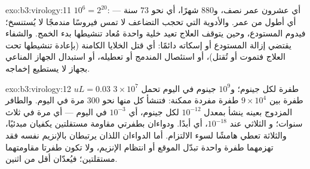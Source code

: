 \begin{solution}{exo:b3:virology:11}
$10^{6} = 2^{20}$: أي عشرون عمر نصف، و$880$ شهرًا، أي نحو $73$ سنة ---
أي أطول من عمر. والأدوية التي تحجب التضاعف لا تمس
فيروسًا مندمجًا لا يُستنسخ؛ فيدوم المستودع، وحين
يتوقف العلاج تعيد خلية واحدة مُعاد تنشيطها بدء الخمج. والشفاء
يقتضي إزالة المستودع أو إسكاته دائمًا: أي قتل الخلايا الكامنة
(بإعادة تنشيطها تحت العلاج فتموت أو تُقتل)، أو استئصال
 المندمج أو تعطيله، أو استبدال الجهاز المناعي بجهاز لا يستطيع 
إخماجه.
\end{solution}

\begin{solution}{exo:b3:virology:12}
$uL = 0.03$ طفرة لكل جينوم؛ و$10^{9}$ جينوم في اليوم تحمل $3\times
10^{7}$ طفرة بين $9\times 10^{4}$ طفرة مفردة ممكنة: فتنشأ كل
منها نحو $300$ مرة في اليوم. والطافر المزدوج بعينه ينشأ بمعدل
$10^{-12}$ لكل جينوم، أي $10^{-3}$ في اليوم --- أي مرة في ثلاث سنوات؛ و
الثلاثي عند $10^{-18}$، أي أبدًا. ودواءان بطفرتي مقاومة
مستقلتين يكفيان مبدئيًا، والثلاثة تعطي هامشًا لسوء
الالتزام. أما الدواءان اللذان يرتبطان بالإنزيم نفسه فقد تهزمهما طفرة
واحدة تبدّل الموقع أو انتظام الإنزيم، ولا تكون
طفرتا مقاومتهما مستقلتين؛ فيُعدّان أقل من اثنين.
\end{solution}

